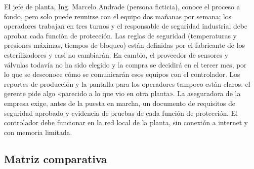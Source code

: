 \documentclass[12pt,a4paper]{article}
\begin{document}
El jefe de planta, Ing. Marcelo Andrade (persona ficticia), conoce el proceso a fondo, pero solo puede
reunirse con el equipo dos mañanas por semana; los operadores trabajan en tres turnos y el responsable
de seguridad industrial debe aprobar cada función de protección. Las reglas de seguridad (temperaturas
y presiones máximas, tiempos de bloqueo) están definidas por el fabricante de los esterilizadores y casi
no cambiarán. En cambio, el proveedor de sensores y válvulas todavía no ha sido elegido y la compra se
decidirá en el tercer mes, por lo que se desconoce cómo se comunicarán esos equipos con el controlador.
Los reportes de producción y la pantalla para los operadores tampoco están claros: el gerente pide algo
«parecido a lo que vio en otra planta». La aseguradora de la empresa exige, antes de la puesta en
marcha, un documento de requisitos de seguridad aprobado y evidencia de pruebas de cada función
de protección. El controlador debe funcionar en la red local de la planta, sin conexión a internet y con
memoria limitada.

\subsection{Matriz comparativa}
\end{document}

